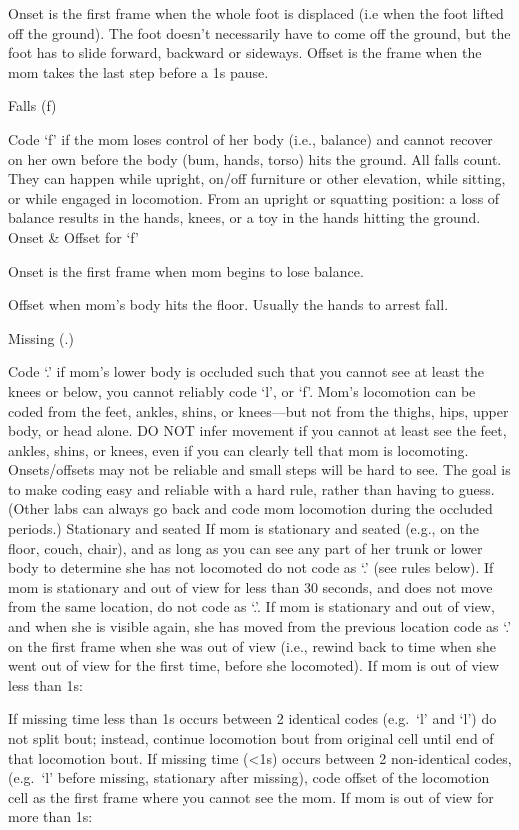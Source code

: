 \documentclass[
]{book}
\begin{document}
Onset is the first frame when the whole foot is displaced (i.e when the foot lifted off the ground). The foot doesn't necessarily have to come off the ground, but the foot has to slide forward, backward or sideways.
Offset is the frame when the mom takes the last step before a 1s pause.

Falls (f)

Code `f' if the mom loses control of her body (i.e., balance) and cannot recover on her own before the body (bum, hands, torso) hits the ground. All falls count. They can happen while upright, on/off furniture or other elevation, while sitting, or while engaged in locomotion.
From an upright or squatting position: a loss of balance results in the hands, knees, or a toy in the hands hitting the ground.
Onset \& Offset for `f'

Onset is the first frame when mom begins to lose balance.

Offset when mom's body hits the floor. Usually the hands to arrest fall.

Missing (.)

Code `.' if mom's lower body is occluded such that you cannot see at least the knees or below, you cannot reliably code `l', or `f'. Mom's locomotion can be coded from the feet, ankles, shins, or knees---but not from the thighs, hips, upper body, or head alone. DO NOT infer movement if you cannot at least see the feet, ankles, shins, or knees, even if you can clearly tell that mom is locomoting. Onsets/offsets may not be reliable and small steps will be hard to see. The goal is to make coding easy and reliable with a hard rule, rather than having to guess. (Other labs can always go back and code mom locomotion during the occluded periods.)
Stationary and seated
If mom is stationary and seated (e.g., on the floor, couch, chair), and as long as you can see any part of her trunk or lower body to determine she has not locomoted do not code as `.' (see rules below). If mom is stationary and out of view for less than 30 seconds, and does not move from the same location, do not code as `.'. If mom is stationary and out of view, and when she is visible again, she has moved from the previous location code as `.' on the first frame when she was out of view (i.e., rewind back to time when she went out of view for the first time, before she locomoted).
If mom is out of view less than 1s:

If missing time less than 1s occurs between 2 identical codes (e.g.~`l' and `l') do not split bout; instead, continue locomotion bout from original cell until end of that locomotion bout.
If missing time (\textless1s) occurs between 2 non-identical codes, (e.g.~`l' before missing, stationary after missing), code offset of the locomotion cell as the first frame where you cannot see the mom.
If mom is out of view for more than 1s:
\end{document}
